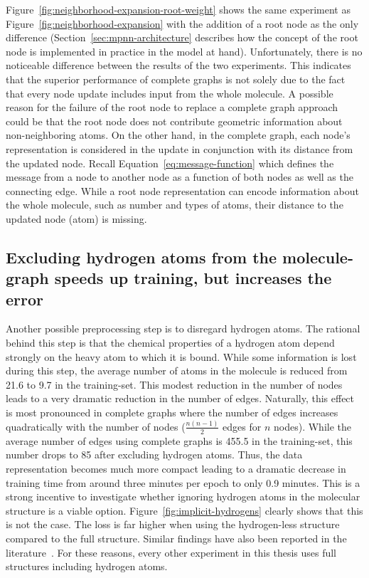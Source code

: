 Figure~\ref{fig:neighborhood-expansion-root-weight} shows the same experiment as Figure~\ref{fig:neighborhood-expansion} with the addition of a root node as the only difference (Section~\ref{sec:mpnn-architecture} describes how the concept of the root node is implemented in practice in the model at hand). Unfortunately, there is no noticeable difference between the results of the two experiments. This indicates that the superior performance of complete graphs is not solely due to the fact that every node update includes input from the whole molecule. A possible reason for the failure of the root node to replace a complete graph approach could be that the root node does not contribute geometric information about non-neighboring atoms. On the other hand, in the complete graph, each node's representation is considered in the update in conjunction with its distance from the updated node. Recall Equation~\ref{eq:message-function} which defines the message from a node to another node as a function of both nodes as well as the connecting edge. While a root node representation can encode information about the whole molecule, such as number and types of atoms, their distance to the updated node (atom) is missing.


\subsection{Excluding hydrogen atoms from the molecule-graph speeds up training, but increases the error}
\label{sec:no-hydrogens}

Another possible preprocessing step is to disregard hydrogen atoms. The rational behind this step is that the chemical properties of a hydrogen atom depend strongly on the heavy atom to which it is bound. While some information is lost during this step, the average number of atoms in the molecule is reduced from 21.6 to 9.7 in the training-set. This modest reduction in the number of nodes leads to a very dramatic reduction in the number of edges. Naturally, this effect is most pronounced in complete graphs where the number of edges increases quadratically with the number of nodes ($\frac{n(n - 1)}{2}$ edges for $n$ nodes). While the average number of edges using complete graphs is 455.5 in the training-set, this number drops to 85 after excluding hydrogen atoms. Thus, the data representation becomes much more compact leading to a dramatic decrease in training time from around three minutes per epoch to only 0.9 minutes. This is a strong incentive to investigate whether ignoring hydrogen atoms in the molecular structure is a viable option. Figure~\ref{fig:implicit-hydrogens} clearly shows that this is not the case. The loss is far higher when using the hydrogen-less structure compared to the full structure. Similar findings have also been reported in the literature~\cite{Gilmer2017}. For these reasons, every other experiment in this thesis uses full structures including hydrogen atoms.
%


